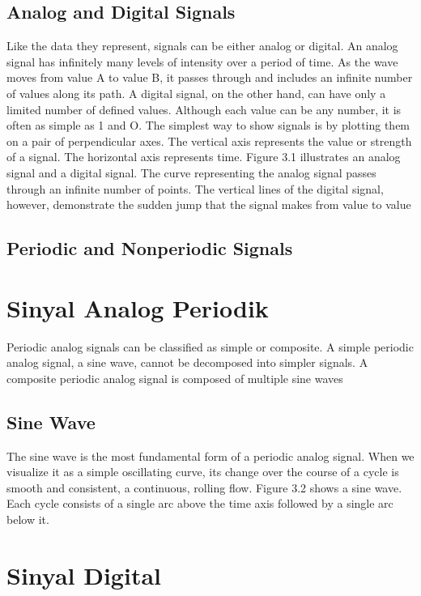 \subsection{Analog and Digital Signals}
Like the data they represent, signals can be either analog or digital. An analog signal has infinitely many levels of intensity over a period of time. As the wave moves from value A to value B, it passes through and includes an infinite number of values along its path. A digital signal, on the other hand, can have only a limited number of defined values. Although each value can be any number, it is often as simple as 1 and O. The simplest way to show signals is by plotting them on a pair of perpendicular axes. The vertical axis represents the value or strength of a signal. The horizontal axis represents time. Figure 3.1 illustrates an analog signal and a digital signal. The curve representing the analog signal passes through an infinite number of points. The vertical lines of the digital signal, however, demonstrate the sudden jump that the signal makes from value to value

\subsection{Periodic and Nonperiodic Signals}

\section{Sinyal Analog Periodik}
Periodic analog signals can be classified as simple or composite. A simple periodic analog signal, a sine wave, cannot be decomposed into simpler signals. A composite periodic analog signal is composed of multiple sine waves

\subsection{Sine Wave}
The sine wave is the most fundamental form of a periodic analog signal. When we visualize it as a simple oscillating curve, its change over the course of a cycle is smooth and consistent, a continuous, rolling flow. Figure 3.2 shows a sine wave. Each cycle consists of a single arc above the time axis followed by a single arc below it.

\section{Sinyal Digital}

